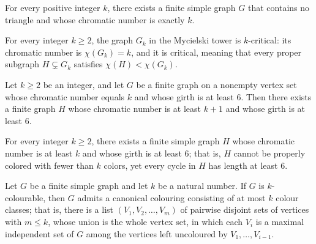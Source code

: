 \begin{theorem}
\label{SimpleGraph.exists_triangleFree_chromaticNumber_eq}
\leanok
For every positive integer $k$, there exists a finite simple graph $G$ that contains no
triangle and whose chromatic number is exactly $k$.
\end{theorem}

\begin{theorem}
\label{SimpleGraph.mycielskiTower_isKCritical}
\leanok
{}
For every integer $k \ge 2$, the graph $G_k$ in the Mycielski tower is $k$-critical: its
chromatic number is $\chi(G_k) = k$, and it is critical, meaning that every proper
subgraph $H \subsetneq G_k$ satisfies $\chi(H) < \chi(G_k)$.
\end{theorem}

\begin{theorem}
\label{SimpleGraph.descartes_construction}
\leanok
Let $k \ge 2$ be an integer, and let $G$ be a finite graph on a nonempty vertex set
whose chromatic number equals $k$ and whose girth is at least $6$. Then there exists a
finite graph $H$ whose chromatic number is at least $k+1$ and whose girth is at least
$6$.
\end{theorem}

\begin{theorem}
\label{SimpleGraph.exists_chromaticNumber_ge_girth_six}
\leanok
For every integer $k \ge 2$, there exists a finite simple graph $H$ whose chromatic
number is at least $k$ and whose girth is at least $6$; that is, $H$ cannot be properly
colored with fewer than $k$ colors, yet every cycle in $H$ has length at least $6$.
\end{theorem}

\begin{theorem}
\label{SimpleGraph.exists_isCanonicalColouring}
\leanok
{}
Let $G$ be a finite simple graph and let $k$ be a natural number. If $G$ is
$k$-colourable, then $G$ admits a canonical colouring consisting of at most $k$ colour
classes; that is, there is a list $(V_1, V_2, \dots, V_m)$ of pairwise disjoint sets of
vertices with $m \le k$, whose union is the whole vertex set, in which each $V_i$ is a
maximal independent set of $G$ among the vertices left uncoloured by $V_1, \dots,
V_{i-1}$.
\end{theorem}
